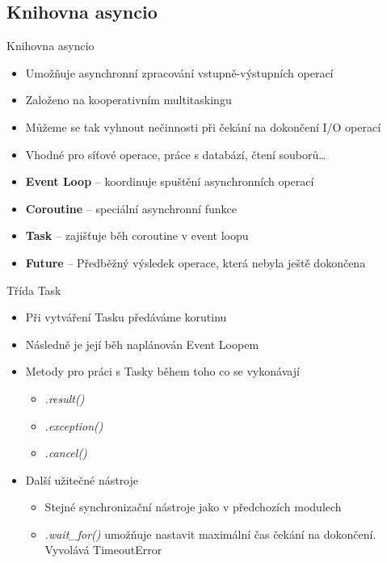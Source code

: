 \documentclass{beamer}
\begin{document}
\subsection{Knihovna asyncio}
\begin{frame}{Knihovna asyncio}
    \begin{itemize}
        \item Umožňuje asynchronní zpracování vstupně-výstupních operací
        \item Založeno na kooperativním multitaskingu
        \item Můžeme se tak vyhnout nečinnosti při čekání na dokončení I/O operací
        \item Vhodné pro síťové operace, práce s databází, čtení souborů…
        
        \vskip 0.35in
        \item \textbf{Event Loop} – koordinuje spuštění asynchronních operací
        \item \textbf{Coroutine} – speciální asynchronní funkce
        \item \textbf{Task} – zajišťuje běh coroutine v event loopu
        \item \textbf{Future} – Předběžný výsledek operace, která nebyla ještě dokončena
    \end{itemize}
\end{frame}

\begin{frame}{Třída Task}
    \begin{itemize}
        \item Při vytváření Tasku předáváme korutinu
        \item Následně je její běh naplánován Event Loopem
        \item Metody pro práci s Tasky během toho co se vykonávají
        \begin{itemize}
            \item \textit{.result()}
            \item \textit{.exception()}
            \item \textit{.cancel()}
        \end{itemize}
        
        \vskip 0.25in
        \item Další užitečné nástroje
        \begin{itemize}
            \item Stejné synchronizační nástroje jako v předchozích modulech

            \item \textit{.wait\_for()} umožňuje nastavit maximální čas čekání na dokončení. Vyvolává TimeoutError
        \end{itemize}
    \end{itemize}
\end{frame}
\end{document}

